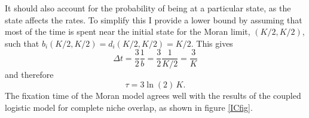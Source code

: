 It should also account for the probability of being at a particular state, as the state affects the rates. 
To simplify this I provide a lower bound by assuming that most of the time is spent near the initial state for the Moran limit, $\left(K/2,K/2\right)$, such that $b_i\left(K/2,K/2\right)=d_i\left(K/2,K/2\right)=K/2$. 
This gives%
\begin{equation}
\Delta t = \frac{3}{2}\frac{1}{b} = \frac{3}{2}\frac{1}{K/2}  = \frac{3}{K}
\end{equation}
and therefore
\begin{equation}
\tau = 3\ln(2)\, K. \label{morantime}
\end{equation}
The fixation time of the Moran model agrees well with the results of the coupled logistic model for complete niche overlap, as shown in figure \ref{ICfig}. 



\iffalse
